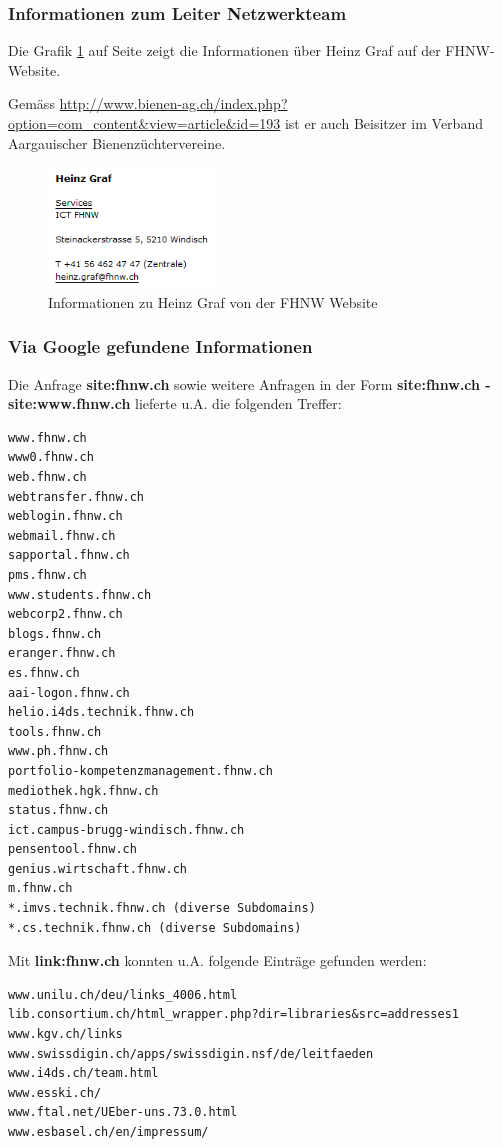 \documentclass[a4paper,11pt]{scrartcl}
\begin{document}
\subsubsection{Informationen zum Leiter Netzwerkteam}
Die Grafik \ref{fig:heinz_graf1} auf Seite \pageref{fig:heinz_graf1} zeigt die Informationen über Heinz Graf auf der FHNW-Website.

Gemäss \url{http://www.bienen-ag.ch/index.php?option=com_content&view=article&id=193} ist er auch Beisitzer im Verband Aargauischer Bienenzüchtervereine.
\begin{figure}[p]
	\centering
	\includegraphics[width=0.4\textwidth]{../aufg5/heinz_graf1.png}
	\caption{Informationen zu Heinz Graf von der FHNW Website}
	\label{fig:heinz_graf1}
\end{figure}

\subsubsection{Via Google gefundene Informationen}
Die Anfrage \textbf{site:fhnw.ch} sowie weitere Anfragen in der Form \textbf{site:fhnw.ch -site:www.fhnw.ch} lieferte u.A. die folgenden Treffer:
\begin{lstlisting}
www.fhnw.ch
www0.fhnw.ch
web.fhnw.ch
webtransfer.fhnw.ch
weblogin.fhnw.ch
webmail.fhnw.ch
sapportal.fhnw.ch
pms.fhnw.ch
www.students.fhnw.ch
webcorp2.fhnw.ch
blogs.fhnw.ch
eranger.fhnw.ch
es.fhnw.ch
aai-logon.fhnw.ch
helio.i4ds.technik.fhnw.ch
tools.fhnw.ch
www.ph.fhnw.ch
portfolio-kompetenzmanagement.fhnw.ch
mediothek.hgk.fhnw.ch
status.fhnw.ch
ict.campus-brugg-windisch.fhnw.ch
pensentool.fhnw.ch
genius.wirtschaft.fhnw.ch
m.fhnw.ch
*.imvs.technik.fhnw.ch (diverse Subdomains)
*.cs.technik.fhnw.ch (diverse Subdomains)
\end{lstlisting}
Mit \textbf{link:fhnw.ch} konnten u.A. folgende Einträge gefunden werden:
\begin{lstlisting}
www.unilu.ch/deu/links_4006.html
lib.consortium.ch/html_wrapper.php?dir=libraries&src=addresses1
www.kgv.ch/links
www.swissdigin.ch/apps/swissdigin.nsf/de/leitfaeden
www.i4ds.ch/team.html
www.esski.ch/
www.ftal.net/UEber-uns.73.0.html
www.esbasel.ch/en/impressum/
\end{lstlisting}
\end{document}
